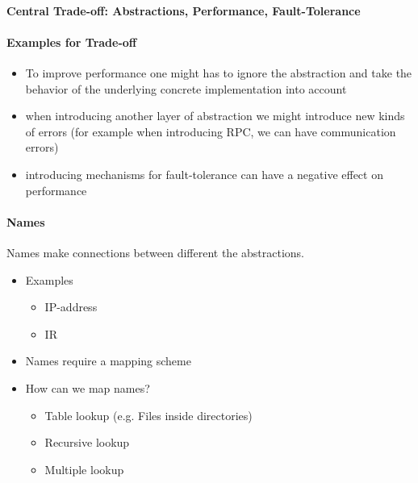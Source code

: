 \paragraph{Central Trade-off: Abstractions, Performance, Fault-Tolerance}
\begin{figure}[ht!]
  \centering
\end{figure}

\paragraph{Examples for Trade-off}
\begin{itemize}
\item To improve performance one might has to ignore the abstraction
  and take the behavior of the underlying concrete implementation into
  account
\item when introducing another layer of abstraction we might
  introduce new kinds of errors (for example when introducing RPC,
  we can have communication errors)
\item introducing mechanisms for fault-tolerance can have
  a negative effect on performance
\end{itemize}

\paragraph{Names}
Names make connections between different the abstractions.

\begin{itemize}
\item Examples
  \begin{itemize}
  \item IP-address
  \item IR
  \end{itemize}
\item Names require a mapping scheme
\item How can we map names?
  \begin{itemize}
  \item Table lookup (e.g. Files inside directories)
  \item Recursive lookup
  \item Multiple lookup
  \end{itemize}
\end{itemize}

